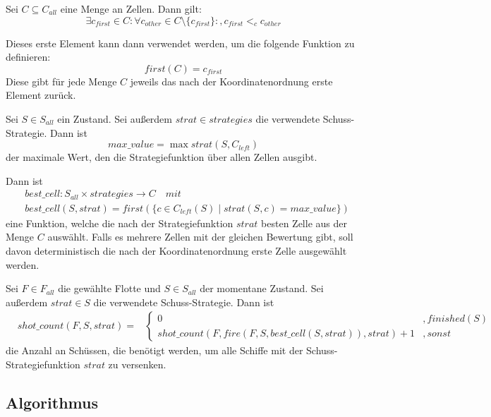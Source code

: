 \documentclass[a4paper,12pt]{llncs}
\numberwithin{equation}{section}
\begin{document}
\begin{definition}
Sei $C \subseteq C_{all}$ eine Menge an Zellen.
Dann gilt:
\[
\exists c_{first} \in C \colon \forall c_{other} \in C \setminus \{c_{first}\} \colon , c_{first} <_c c_{other}
\]

Dieses erste Element kann dann verwendet werden, um die folgende Funktion zu definieren:
\[
first(C)=c_{first}
\]
Diese gibt für jede Menge $C$ jeweils das nach der Koordinatenordnung erste Element zurück.
\end{definition}

\begin{definition}
Sei $S\in S_{all}$ ein Zustand.
Sei außerdem $strat \in strategies$ die verwendete Schuss-Strategie.
Dann ist
\[
max\_value=\max strat(S, C_{left})
\]
der maximale Wert, den die Strategiefunktion über allen Zellen ausgibt.

Dann ist
\begin{align}
&best\_cell:S_{all} \times strategies \rightarrow C \quad mit \nonumber\\
&best\_cell(S, strat)=first(\{c \in C_{left}(S) \mid strat(S, c) = max\_value\})
\nonumber
\end{align}
eine Funktion, welche die nach der Strategiefunktion $strat$ besten Zelle aus der Menge $C$ auswählt.
Falls es mehrere Zellen mit der gleichen Bewertung gibt, soll davon deterministisch die nach der Koordinatenordnung erste Zelle ausgewählt werden.
\end{definition}

\begin{definition}
Sei $F\in F_{all}$ die gewählte Flotte und $S\in S_{all}$ der momentane Zustand.
Sei außerdem $strat \in S$ die verwendete Schuss-Strategie.
Dann ist
\begin{align}
&shot\_count(F, S, strat)=
& \begin{cases} 
  	0& ,finished(S) \\
      shot\_count(F, fire(F, S, best\_cell(S, strat)), strat) + 1 & ,sonst
   \end{cases}
\nonumber
\end{align}
die Anzahl an Schüssen, die benötigt werden, um alle Schiffe mit der Schuss-Strategiefunktion $strat$ zu versenken.
\end{definition}

\subsection{Algorithmus}
\end{document}
